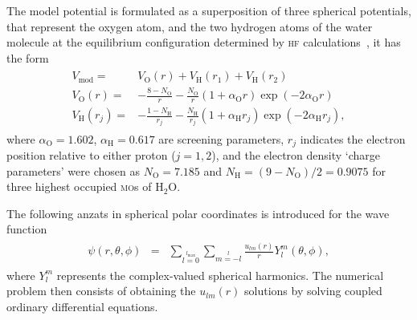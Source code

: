 The model potential is formulated as a superposition of three
spherical potentials, that represent the oxygen atom, and the two
hydrogen atoms of the water molecule at the equilibrium configuration
determined by \textsc{hf} calculations~\cite{illescas_2015}, it has
the form
%
\begin{eqnarray}
  \begin{split}
    V_{\mathrm{mod}} = & V_{\mathrm{O}}(r) + V_{\mathrm{H}}(r_{1}) 
    + V_{\mathrm{H}}(r_{2}) \\
    V_{\mathrm{O}}(r) = & -\frac{8 - N_{\mathrm{O}}}{r} -
    \frac{N_{\mathrm{O}}}{r}(1 + \alpha_{\mathrm{O}}r) \exp(-2\alpha_{\mathrm{O}}r) \\
    V_{\mathrm{H}}(r_{j}) = & -\frac{1 - N_{\mathrm{H}}}{r_{j}} -
    \frac{N_{\mathrm{H}}}{r_{j}}(1 + \alpha_{\mathrm{H}}r_{j}) \exp(-2\alpha_{\mathrm{H}}r_{j}),
  \end{split}
  \label{eq:model_potential}
\end{eqnarray}
%
where $\alpha_{\mathrm{O}} = 1.602$, $\alpha_{\mathrm{H}} = 0.617$ are
screening parameters, $r_{j}$ indicates the electron position relative
to either proton ($j=1,2$), and the electron density `charge
parameters' were chosen as $N_{\mathrm{O}} = 7.185$ and
$N_{\mathrm{H}} = (9 - N_{\mathrm{O}})/2 = 0.9075$ for three highest
occupied \textsc{mo}s of H$_{2}$O. 

The following anzats in spherical polar coordinates is introduced for
the wave function
%
\begin{eqnarray}
  \begin{split}
    \psi(r,\theta,\phi) & = & \sum\limits_{l=0}\limits^{l_{\mathrm{max}}}
    \sum\limits_{m=-l}\limits^{l} \frac{u_{lm}(r)}{r}
    Y_{l}^{m}(\theta, \phi),
  \end{split}
  \label{eq:spherical_anzats}
\end{eqnarray}
%
where $Y_{l}^{m}$ represents the complex-valued spherical
harmonics. The numerical problem then consists of obtaining the
$u_{lm}(r)$ solutions by solving coupled ordinary differential
equations.

